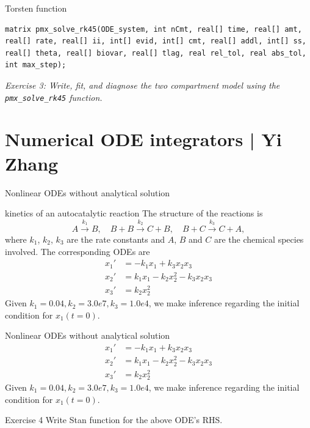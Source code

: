 \documentclass[presentation, allowframebreaks]{beamer}
\begin{document}
\begin{frame}[fragile,label={sec:org976a751}]{Torsten function}
 \begin{verbatim}
matrix pmx_solve_rk45(ODE_system, int nCmt, real[] time, real[] amt, real[] rate, real[] ii, int[] evid, int[] cmt, real[] addl, int[] ss, real[] theta, real[] biovar, real[] tlag, real rel_tol, real abs_tol, int max_step);
\end{verbatim}
\emph{\textcolor{MRGGreen}{Exercise 3}: Write, fit, and diagnose the two compartment model using the \texttt{pmx\_solve\_rk45} function.}
\end{frame}

\section{Numerical ODE integrators | \footnotesize{Yi Zhang}}
\label{sec:org1eef964}
\label{org920b505}
\begin{frame}[label={sec:org49c2693}]{Nonlinear ODEs without analytical solution}
\begin{block}{kinetics of an autocatalytic reaction \cite{robertson_numerical_1966}}
The structure of the reactions is 
\begin{equation*}
A \xrightarrow{k_1} B,\quad
B+B \xrightarrow{k_2} C + B,\quad
B+C \xrightarrow{k_3} C + A,
\end{equation*}
where \(k_1\), \(k_2\), \(k_3\) are the rate
constants and \(A\), \(B\) and \(C\) are the chemical species
involved. The corresponding ODEs are
\begin{align*}
x_1' &= -k_1x_1 + k_3x_2x_3\\
x_2' &=  k_1x_1 - k_2x_2^2 - k_3x_2x_3\\
x_3' &=  k_2x_2^2
\end{align*}
Given \(k_1=0.04, k_2=3.0e7, k_3=1.0e4\), we make inference
regarding the initial condition for \(x_1(t=0)\).
\end{block}
\end{frame}
\begin{frame}[label={sec:orgffbcce3}]{Nonlinear ODEs without analytical solution}
\begin{align*}
x_1' &= -k_1x_1 + k_3x_2x_3\\
x_2' &=  k_1x_1 - k_2x_2^2 - k_3x_2x_3\\
x_3' &=  k_2x_2^2
\end{align*}
Given \(k_1=0.04, k_2=3.0e7, k_3=1.0e4\), we make inference
regarding the initial condition for \(x_1(t=0)\).
\begin{block}{Exercise 4}
Write Stan function for the above ODE's RHS.
\end{block}
\end{frame}
\end{document}
